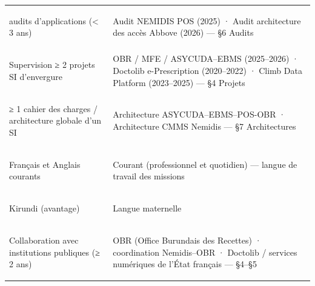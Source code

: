 \begin{longtable}{>{\bfseries\raggedright\arraybackslash}p{6.4cm} >{\raggedright\arraybackslash}p{10.3cm}}
  2 audits d'applications (< 3 ans)
    & Audit NEMIDIS POS (2025) · Audit architecture des accès Abbove (2026) — §6 Audits \\

  Supervision ≥ 2 projets SI d'envergure
    & OBR / MFE / ASYCUDA–EBMS (2025–2026) · Doctolib e-Prescription (2020–2022) · Climb Data Platform (2023–2025) — §4 Projets \\

  ≥ 1 cahier des charges / architecture globale d'un SI
    & Architecture ASYCUDA–EBMS–POS-OBR · Architecture CMMS Nemidis — §7 Architectures \\

  Français et Anglais courants
    & Courant (professionnel et quotidien) — langue de travail des missions \\

  Kirundi (avantage)
    & Langue maternelle \\

  Collaboration avec institutions publiques (≥ 2 ans)
    & OBR (Office Burundais des Recettes) · coordination Nemidis–OBR · Doctolib / services numériques de l'État français — §4–§5 \\

  \bottomrule
\end{longtable}

\vspace{2mm}


